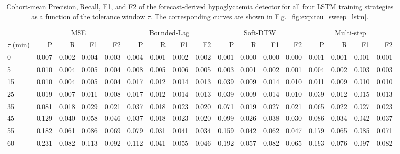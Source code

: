 \begin{appendix}
\begin{landscape}
\begin{table}[tbp]
\centering
\small
\caption[$\tau$-sweep numerical breakdown: LSTM]{Cohort-mean Precision, Recall, F1, and F2 of the forecast-derived hypoglycaemia detector for all four LSTM training strategies as a function of the tolerance window $\tau$. The corresponding curves are shown in Fig.~\ref{fig:exp:tau_sweep_lstm}.}
\label{tab:app:tau_sweep_lstm}
\setlength{\tabcolsep}{4pt}
\begin{tabular}{lrrrrrrrrrrrrrrrr}
\toprule
& \multicolumn{4}{c}{MSE} & \multicolumn{4}{c}{Bounded-Lag} & \multicolumn{4}{c}{Soft-DTW} & \multicolumn{4}{c}{Multi-step} \\
\cmidrule(lr){2-5}\cmidrule(lr){6-9}\cmidrule(lr){10-13}\cmidrule(lr){14-17}
$\tau$ (min) & P & R & F1 & F2 & P & R & F1 & F2 & P & R & F1 & F2 & P & R & F1 & F2 \\
\midrule
 0  & 0.007 & 0.002 & 0.004 & 0.003 & 0.004 & 0.001 & 0.002 & 0.002 & 0.001 & 0.000 & 0.000 & 0.000 & 0.001 & 0.001 & 0.001 & 0.001 \\
 5  & 0.010 & 0.004 & 0.005 & 0.004 & 0.008 & 0.005 & 0.006 & 0.005 & 0.003 & 0.001 & 0.002 & 0.001 & 0.004 & 0.002 & 0.003 & 0.003 \\
15  & 0.010 & 0.004 & 0.005 & 0.004 & 0.017 & 0.012 & 0.014 & 0.013 & 0.039 & 0.009 & 0.014 & 0.010 & 0.011 & 0.009 & 0.010 & 0.010 \\
25  & 0.019 & 0.007 & 0.011 & 0.008 & 0.017 & 0.012 & 0.014 & 0.013 & 0.039 & 0.009 & 0.014 & 0.010 & 0.039 & 0.012 & 0.015 & 0.013 \\
35  & 0.081 & 0.018 & 0.029 & 0.021 & 0.037 & 0.018 & 0.023 & 0.020 & 0.071 & 0.019 & 0.027 & 0.021 & 0.065 & 0.022 & 0.027 & 0.023 \\
45  & 0.129 & 0.040 & 0.058 & 0.046 & 0.037 & 0.018 & 0.023 & 0.020 & 0.099 & 0.026 & 0.038 & 0.030 & 0.086 & 0.034 & 0.042 & 0.037 \\
55  & 0.182 & 0.061 & 0.086 & 0.069 & 0.079 & 0.031 & 0.041 & 0.034 & 0.159 & 0.042 & 0.062 & 0.047 & 0.179 & 0.065 & 0.085 & 0.071 \\
60  & 0.231 & 0.082 & 0.113 & 0.092 & 0.112 & 0.041 & 0.055 & 0.046 & 0.192 & 0.057 & 0.082 & 0.065 & 0.193 & 0.076 & 0.097 & 0.082 \\
\bottomrule
\end{tabular}
\end{table}
\end{landscape}


\end{appendix}

